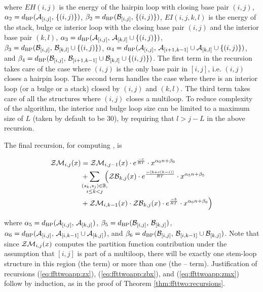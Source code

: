 where
$EH(i,j)$ is the energy of the hairpin loop with closing base pair $(i,j)$,
$\alpha_2 = d_{\text{BP}}(\mathcal A_{[i,j]},\,\{(i,j)\})$,
$\beta_2 = d_{\text{BP}}(\mathcal B_{[i,j]},\,\{(i,j)\})$,
$EI(i,j,k,l)$ is the energy of the stack, bulge or
interior loop with the closing base pair $(i,j)$ and the interior
base pair $(k,l)$,
$\alpha_3 = d_{\text{BP}}(\mathcal A_{[i,j]},\,\mathcal A_{[k,l]} \cup \{(i,j)\})$,
$\beta_3 = d_{\text{BP}}(\mathcal B_{[i,j]},\,\mathcal B_{[k,l]} \cup \{(i,j)\})$,
$\alpha_4 = d_{\text{BP}}(\mathcal A_{[i,j]},\,\mathcal A_{[i+1,k-1]} \cup
\mathcal A_{[k,l]} \cup\{(i,j)\})$, and
$\beta_4 = d_{\text{BP}}(\mathcal B_{[i,j]},\,\mathcal B_{[i+1,k-1]} \cup
\mathcal B_{[k,l]} \cup\{(i,j)\})$.
The first term in the
recursion takes care of the case where $(i,j)$ is the only base pair
in $[i,j]$, i.e. $(i,j)$ closes a hairpin loop. The second term
handles the case where there is an interior loop (or a bulge or a
stack) closed by $(i,j)$ and $(k,l)$. The third term takes care of
all the structures where $(i,j)$ closes a multiloop. To reduce
complexity of the algorithm, the interior and bulge loop size can be
limited to a maximum size of $L$ (taken by default to be $30$),
by requiring that $l>j-L$ in the above recursion.

The final recursion, for computing \emZM{}, is

\begin{align}
\label{eq:ffttwoapp:zmx}
\begin{split}
\emZM{i,j} &= \emZM{i,j-1} \cdot \boltzE{c} \cdot x^{\ab{0}} \\
&+ \sum_{\mathclap{\substack{(s_k,s_j) \in \bpSet, \\ i \leq k < j }}}\enspace
\Big( \emZB{k,j} \cdot \boltzE{(b+c(k-i))} \cdot x^{\ab{5}} \\
&+ \emZM{i,k-1} \cdot \emZB{k,j} \cdot \boltzE{b} \cdot x^{\ab{6}} \Big)
\end{split}
\end{align}

where
$\alpha_5 = d_{\text{BP}}(\mathcal A_{[i,j]},\,\mathcal A_{[k,j]})$,
$\beta_5 = d_{\text{BP}}(\mathcal B_{[i,j]},\,\mathcal B_{[k,j]})$,
$\alpha_6 =d_{\text{BP}}(\mathcal A_{[i,j]},\,\mathcal A_{[i,k-1]} \cup \mathcal A_{[k,j]})$, and
$\beta_6 =d_{\text{BP}}(\mathcal B_{[i,j]},\,\mathcal B_{[i,k-1]} \cup \mathcal B_{[k,j]})$.
Note that since $\mathcal{ZM}_{i,j}(x)$ computes the partition function
contribution under the assumption that $[i,j]$ is part of a
multiloop, there will be exactly one stem-loop structure in this
region (the \emZB{} term) or
more than one (the \emZM{}--\emZB{} term).
Justification of recursions (\ref{eq:ffttwoapp:zx}),
(\ref{eq:ffttwoapp:zbx}), and
(\ref{eq:ffttwoapp:zmx})
follow by induction, as in the proof of Theorem \ref{thm:ffttwo:recursions}.


